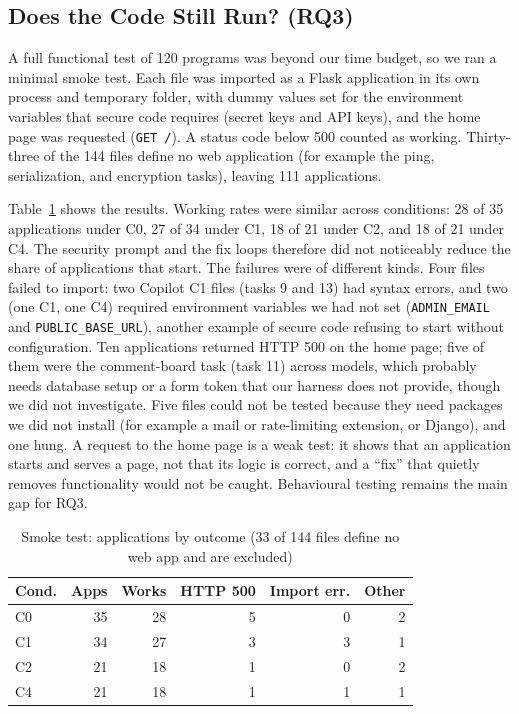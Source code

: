 \documentclass[conference]{IEEEtran}
\begin{document}
\subsection{Does the Code Still Run? (RQ3)}
A full functional test of 120 programs was beyond our time budget, so we ran a minimal smoke test. Each file was imported as a Flask application in its own process and temporary folder, with dummy values set for the environment variables that secure code requires (secret keys and API keys), and the home page was requested (\texttt{GET /}). A status code below 500 counted as working. Thirty-three of the 144 files define no web application (for example the ping, serialization, and encryption tasks), leaving 111 applications.

Table~\ref{tab:smoke} shows the results. Working rates were similar across conditions: 28 of 35 applications under C0, 27 of 34 under C1, 18 of 21 under C2, and 18 of 21 under C4. The security prompt and the fix loops therefore did not noticeably reduce the share of applications that start. The failures were of different kinds. Four files failed to import: two Copilot C1 files (tasks 9 and 13) had syntax errors, and two (one C1, one C4) required environment variables we had not set (\texttt{ADMIN\_EMAIL} and \texttt{PUBLIC\_BASE\_URL}), another example of secure code refusing to start without configuration. Ten applications returned HTTP 500 on the home page; five of them were the comment-board task (task 11) across models, which probably needs database setup or a form token that our harness does not provide, though we did not investigate. Five files could not be tested because they need packages we did not install (for example a mail or rate-limiting extension, or Django), and one hung. A request to the home page is a weak test: it shows that an application starts and serves a page, not that its logic is correct, and a ``fix'' that quietly removes functionality would not be caught. Behavioural testing remains the main gap for RQ3.

\begin{table}[t]
\caption{Smoke test: applications by outcome (33 of 144 files define no web app and are excluded)}
\label{tab:smoke}
\centering
\footnotesize
\begin{tabular}{@{}lrrrrr@{}}
\toprule
Cond. & Apps & Works & HTTP 500 & Import err. & Other \\
\midrule
C0 & 35 & 28 & 5 & 0 & 2 \\
C1 & 34 & 27 & 3 & 3 & 1 \\
C2 & 21 & 18 & 1 & 0 & 2 \\
C4 & 21 & 18 & 1 & 1 & 1 \\
\bottomrule
\end{tabular}
\end{table}
\end{document}
